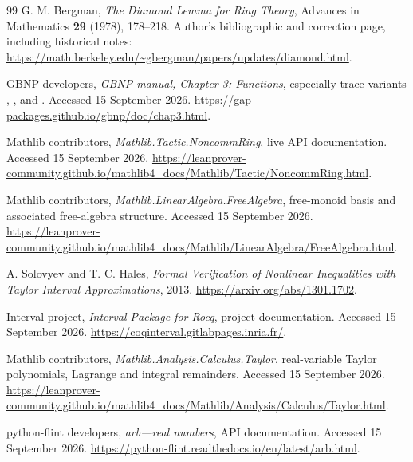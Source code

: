 \begin{thebibliography}{99}
G. M. Bergman, \emph{The Diamond Lemma for Ring Theory}, Advances in Mathematics \textbf{29} (1978), 178--218. Author's bibliographic and correction page, including historical notes:
\url{https://math.berkeley.edu/~gbergman/papers/updates/diamond.html}.

GBNP developers, \emph{GBNP manual, Chapter 3: Functions}, especially trace variants , , and . Accessed 15 September 2026.
\url{https://gap-packages.github.io/gbnp/doc/chap3.html}.

Mathlib contributors, \emph{Mathlib.Tactic.NoncommRing}, live API documentation. Accessed 15 September 2026.
\url{https://leanprover-community.github.io/mathlib4_docs/Mathlib/Tactic/NoncommRing.html}.

Mathlib contributors, \emph{Mathlib.LinearAlgebra.FreeAlgebra}, free-monoid basis and associated free-algebra structure. Accessed 15 September 2026.
\url{https://leanprover-community.github.io/mathlib4_docs/Mathlib/LinearAlgebra/FreeAlgebra.html}.

A. Solovyev and T. C. Hales, \emph{Formal Verification of Nonlinear Inequalities with Taylor Interval Approximations}, 2013.
\url{https://arxiv.org/abs/1301.1702}.

Interval project, \emph{Interval Package for Rocq}, project documentation. Accessed 15 September 2026.
\url{https://coqinterval.gitlabpages.inria.fr/}.

Mathlib contributors, \emph{Mathlib.Analysis.Calculus.Taylor}, real-variable Taylor polynomials, Lagrange and integral remainders. Accessed 15 September 2026.
\url{https://leanprover-community.github.io/mathlib4_docs/Mathlib/Analysis/Calculus/Taylor.html}.

python-flint developers, \emph{arb---real numbers}, API documentation. Accessed 15 September 2026.
\url{https://python-flint.readthedocs.io/en/latest/arb.html}.
\end{thebibliography}
